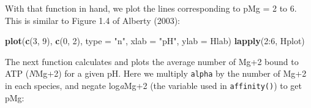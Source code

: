 \documentclass[]{tufte-handout}
\newenvironment{Shaded}{}{}
\newcommand{\KeywordTok}[1]{\textcolor[rgb]{0.00,0.44,0.13}{\textbf{#1}}}
\newcommand{\DataTypeTok}[1]{\textcolor[rgb]{0.56,0.13,0.00}{#1}}
\newcommand{\DecValTok}[1]{\textcolor[rgb]{0.25,0.63,0.44}{#1}}
\newcommand{\FloatTok}[1]{\textcolor[rgb]{0.25,0.63,0.44}{#1}}
\newcommand{\StringTok}[1]{\textcolor[rgb]{0.25,0.44,0.63}{#1}}
\newcommand{\OtherTok}[1]{\textcolor[rgb]{0.00,0.44,0.13}{#1}}
\newcommand{\ControlFlowTok}[1]{\textcolor[rgb]{0.00,0.44,0.13}{\textbf{#1}}}
\newcommand{\OperatorTok}[1]{\textcolor[rgb]{0.40,0.40,0.40}{#1}}
\newcommand{\NormalTok}[1]{#1}
\begin{document}
\begin{Shaded}
\end{Shaded}

With that function in hand, we plot the lines corresponding to pMg = 2
to 6. This is similar to Figure 1.4 of Alberty (2003):

\begin{Shaded}
\begin{Highlighting}[]
\KeywordTok{plot}\NormalTok{(}\KeywordTok{c}\NormalTok{(}\DecValTok{3}\NormalTok{, }\DecValTok{9}\NormalTok{), }\KeywordTok{c}\NormalTok{(}\DecValTok{0}\NormalTok{, }\DecValTok{2}\NormalTok{), }\DataTypeTok{type =} \StringTok{"n"}\NormalTok{, }\DataTypeTok{xlab =} \StringTok{"pH"}\NormalTok{, }\DataTypeTok{ylab =}\NormalTok{ Hlab)}
\KeywordTok{lapply}\NormalTok{(}\DecValTok{2}\OperatorTok{:}\DecValTok{6}\NormalTok{, Hplot)}
\end{Highlighting}
\end{Shaded}

The next function calculates and plots the average number of Mg+2 bound
to ATP (\emph{N}Mg+2) for a given pH. Here we multiply \texttt{alpha} by
the number of Mg+2 in each species, and negate log\emph{a}Mg+2 (the
variable used in {\texttt{affinity()}}) to get pMg:
\end{document}
